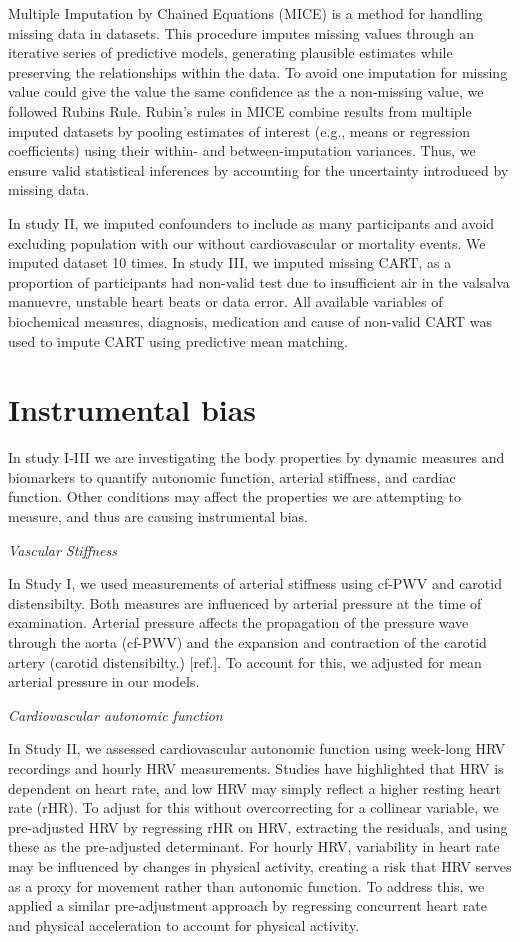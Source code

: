\documentclass[
  a4paper,
  headsepline=true,
  open=any]{scrbook}
\begin{document}
Multiple Imputation by Chained Equations (MICE) is a method for handling
missing data in datasets. This procedure imputes missing values through
an iterative series of predictive models, generating plausible estimates
while preserving the relationships within the data. To avoid one
imputation for missing value could give the value the same confidence as
the a non-missing value, we followed Rubins Rule. Rubin's rules in MICE
combine results from multiple imputed datasets by pooling estimates of
interest (e.g., means or regression coefficients) using their within-
and between-imputation variances. Thus, we ensure valid statistical
inferences by accounting for the uncertainty introduced by missing data.

In study II, we imputed confounders to include as many participants and
avoid excluding population with our without cardiovascular or mortality
events. We imputed dataset 10 times. In study III, we imputed missing
CART, as a proportion of participants had non-valid test due to
insufficient air in the valsalva manuevre, unstable heart beats or data
error. All available variables of biochemical measures, diagnosis,
medication and cause of non-valid CART was used to impute CART using
predictive mean matching.

\hypertarget{instrumental-bias}{%
\section{Instrumental bias}\label{instrumental-bias}}

In study I-III we are investigating the body properties by dynamic
measures and biomarkers to quantify autonomic function, arterial
stiffness, and cardiac function. Other conditions may affect the
properties we are attempting to measure, and thus are causing
instrumental bias.

\emph{Vascular Stiffness}

In Study I, we used measurements of arterial stiffness using cf-PWV and
carotid distensibilty. Both measures are influenced by arterial pressure
at the time of examination. Arterial pressure affects the propagation of
the pressure wave through the aorta (cf-PWV) and the expansion and
contraction of the carotid artery (carotid distensibilty.) {[}ref.{]}.
To account for this, we adjusted for mean arterial pressure in our
models.

\emph{Cardiovascular autonomic function}

In Study II, we assessed cardiovascular autonomic function using
week-long HRV recordings and hourly HRV measurements. Studies have
highlighted that HRV is dependent on heart rate, and low HRV may simply
reflect a higher resting heart rate (rHR). To adjust for this without
overcorrecting for a collinear variable, we pre-adjusted HRV by
regressing rHR on HRV, extracting the residuals, and using these as the
pre-adjusted determinant. For hourly HRV, variability in heart rate may
be influenced by changes in physical activity, creating a risk that HRV
serves as a proxy for movement rather than autonomic function. To
address this, we applied a similar pre-adjustment approach by regressing
concurrent heart rate and physical acceleration to account for physical
activity.
\end{document}

